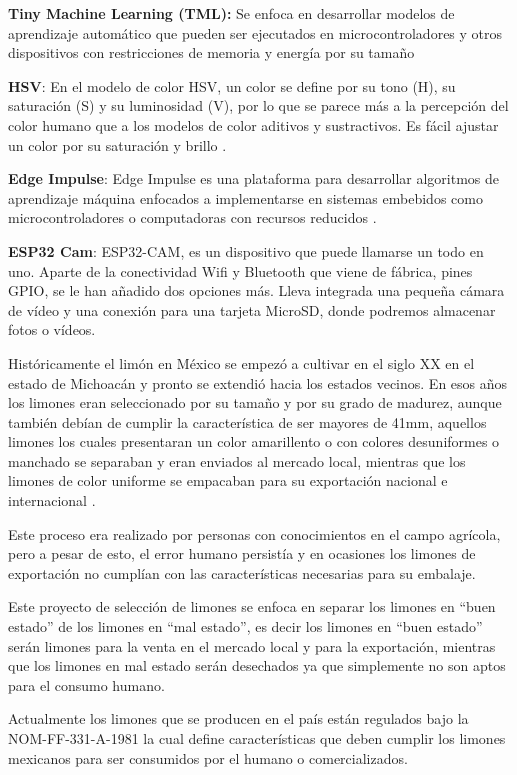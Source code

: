 \textbf{Tiny Machine Learning (TML):} Se enfoca en desarrollar modelos de aprendizaje automático que pueden ser ejecutados en microcontroladores y otros dispositivos con restricciones de memoria y energía por su tamaño \cite{IA}

\textbf{HSV}: En el modelo de color HSV, un color se define por su tono (H), su saturación (S) y su luminosidad (V), por lo que se parece más a la percepción del color humano que a los modelos de color aditivos y sustractivos. Es fácil ajustar un color por su saturación y brillo \cite{ModeloColor}.

\textbf{Edge Impulse}: Edge Impulse es una plataforma para desarrollar algoritmos de aprendizaje máquina enfocados a implementarse en sistemas embebidos como microcontroladores o computadoras con recursos reducidos \cite{EdgeImpulse}.

\textbf{ESP32 Cam}: ESP32-CAM, es un dispositivo que puede llamarse un todo en uno. Aparte de la conectividad Wifi y Bluetooth que viene de fábrica, pines GPIO, se le han añadido dos opciones más. Lleva integrada una pequeña cámara de vídeo y una conexión para una tarjeta MicroSD, donde podremos almacenar fotos o vídeos.

Históricamente el limón en México se empezó a cultivar en el siglo XX en el estado de Michoacán \cite{Frutas} y pronto se extendió hacia los estados vecinos. En esos años los limones eran seleccionado por su tamaño y por su grado de madurez, aunque también debían de cumplir la característica de ser mayores de 41mm, aquellos limones los cuales presentaran un color amarillento o con colores desuniformes o manchado se separaban y eran enviados al mercado local, mientras que los limones de color uniforme se empacaban para su exportación nacional e internacional \cite{Frutas}. 

Este proceso era realizado por personas con conocimientos en el campo agrícola, pero a pesar de esto, el error humano persistía y en ocasiones los limones de exportación no cumplían con las características necesarias para su embalaje.

Este proyecto de selección de limones se enfoca en separar los limones en “buen estado” de los limones en “mal estado”, es decir los limones en “buen estado” serán limones para la venta en el mercado local y para la exportación, mientras que los limones en mal estado serán desechados ya que simplemente no son aptos para el consumo humano.

Actualmente los limones que se producen en el país están regulados bajo la NOM-FF-331-A-1981 la cual define características que deben cumplir los limones mexicanos para ser consumidos por el humano o comercializados.

